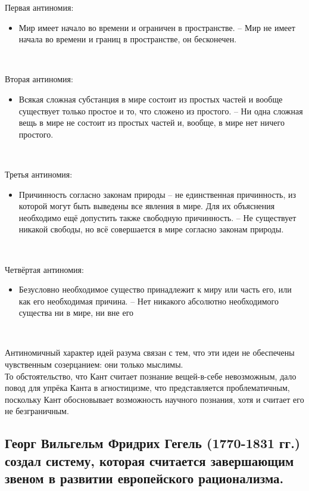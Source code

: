 \documentclass[main.tex]{subfiles}
\begin{document}
{\parindent0pt
Первая антиномия:
\begin{itemize}[nosep,leftmargin=0.5cm]
\item Мир имеет начало во времени и ограничен в пространстве. -- Мир не имеет начала во времени и границ в пространстве, он бесконечен.
\end{itemize}
}
\ 

{\parindent0pt
Вторая антиномия:
\begin{itemize}[nosep,leftmargin=0.5cm]
\item Всякая сложная субстанция в мире состоит из простых частей и вообще существует только простое и то, что сложено из простого. -- Ни одна сложная вещь в мире не состоит из простых частей и, вообще, в мире нет ничего простого.
\end{itemize}
}
\ 

{\parindent0pt
Третья антиномия:
\begin{itemize}[nosep,leftmargin=0.5cm]
\item Причинность согласно законам природы -- не единственная причинность, из которой могут быть выведены все явления в мире. Для их объяснения необходимо ещё допустить также свободную причинность. -- Не существует никакой свободы, но всё совершается в мире согласно законам природы.
\end{itemize}
}
\ 

{\parindent0pt
Четвёртая антиномия:
\begin{itemize}[nosep,leftmargin=0.5cm]
\item Безусловно необходимое существо принадлежит к миру или часть его, или как его необходимая причина. -- Нет никакого абсолютно необходимого существа ни в мире, ни вне его
\end{itemize}
}
\ 

{\parindent0pt
Антиномичный характер идей разума связан с тем, что эти идеи не обеспечены чувственным созерцанием: они только мыслимы.
}
\ \\

{\parindent0pt
То обстоятельство, что Кант считает познание вещей-в-себе невозможным, дало повод для упрёка Канта в агностицизме, что представляется проблематичным, поскольку Кант обосновывает возможность научного познания, хотя и считает его не безграничным.
}



\subsection{Георг Вильгельм Фридрих Гегель (1770-1831 гг.) создал систему, которая считается завершающим звеном в развитии европейского рационализма.}
\end{document}
